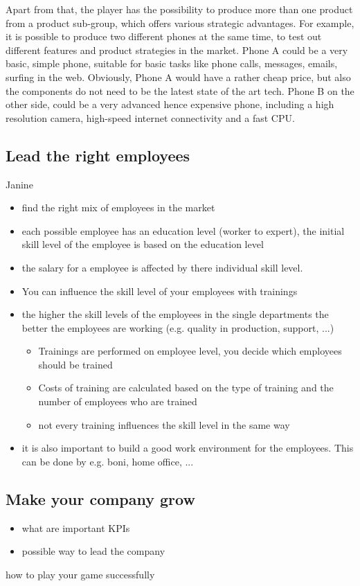 \documentclass[11pt,titlepage,oneside,openany]{book}
\begin{document}
Apart from that, the player has the possibility to produce more than one product from a product sub-group, which offers various strategic advantages. For example, it is possible to produce two different phones at the same time, to test out different features and product strategies in the market. Phone A could be a very basic, simple phone, suitable for basic tasks like phone calls, messages, emails, surfing in the web. Obviously, Phone A would have a rather cheap price, but also the components do not need to be the latest state of the art tech. Phone B on the other side, could be a very advanced hence expensive phone, including a high resolution camera, high-speed internet connectivity and a fast CPU.\\

\subsection{Lead the right employees}
Janine
\begin{itemize}
    \item find the right mix of employees in the market 
    \item each possible employee has an education level (worker to expert), the initial skill level of the employee is based on the education level
    \item the salary for a employee is affected by there individual skill level.
    \item You can influence the skill level of your employees with trainings 
    \item the higher the skill levels of the employees in the single departments the better the employees are working (e.g. quality in production, support, ...) 
    \begin{itemize}
    \item Trainings are performed on employee level, you decide which employees should be trained 
    \item Costs of training are calculated based on the type of training and the number of employees who are trained
    \item not every training influences the skill level in the same way 
    \end{itemize}
    \item it is also important to build a good work environment for the employees. This can be done by e.g. boni, home office, ...
\end{itemize}

\subsection{Make your company grow}
\begin{itemize}
    \item what are important KPIs
    \item possible way to lead the company
\end{itemize}
how to play your game successfully
\end{document}
